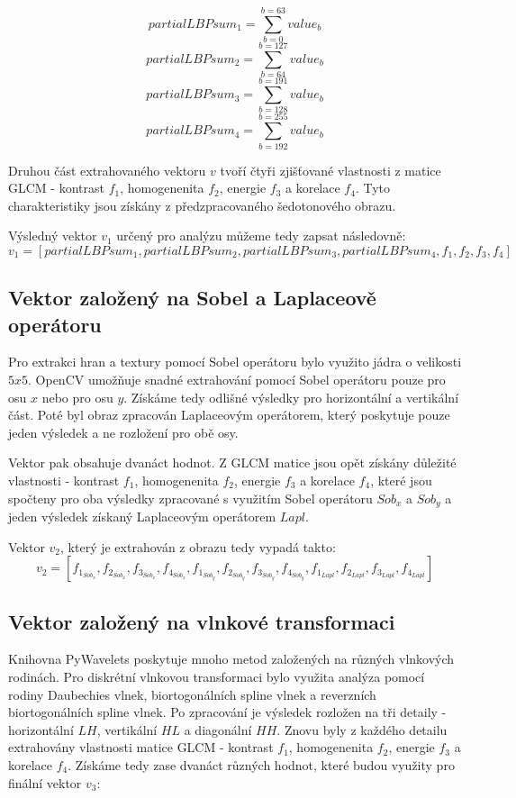 $$partialLBPsum_1 = \sum_{b=0}^{b=63} value_b $$
$$partialLBPsum_2 = \sum_{b=64}^{b=127} value_b $$
$$partialLBPsum_3 = \sum_{b=128}^{b=191} value_b $$
$$partialLBPsum_4 = \sum_{b=192}^{b=255} value_b $$

Druhou část extrahovaného vektoru $v$ tvoří čtyři zjišťované vlastnosti z matice GLCM - kontrast $f_1$, homogenenita $f_2$, energie $f_3$ a korelace $f_4$. Tyto charakteristiky jsou získány z předzpracovaného šedotonového obrazu.

Výsledný vektor $v_1$ určený pro analýzu můžeme tedy zapsat následovně:
$$v_1 = [partialLBPsum_1, partialLBPsum_2, partialLBPsum_3, partialLBPsum_4, f_1, f_2, f_3, f_4]$$

\subsection{Vektor založený na Sobel a Laplaceově operátoru}
Pro extrakci hran a textury pomocí Sobel operátoru bylo využito jádra o velikosti $5x5$. OpenCV umožňuje snadné extrahování pomocí Sobel operátoru pouze pro osu $x$ nebo pro osu $y$. Získáme tedy odlišné výsledky pro horizontální a vertikální část. Poté byl obraz zpracován Laplaceovým operátorem, který poskytuje pouze jeden výsledek a ne rozložení pro obě osy. 

Vektor pak obsahuje dvanáct hodnot. Z GLCM matice jsou opět získány důležité vlastnosti - kontrast $f_1$, homogenenita $f_2$, energie $f_3$ a korelace $f_4$, které jsou spočteny pro oba výsledky zpracované s využitím Sobel operátoru $Sob_x$ a $Sob_y$ a jeden výsledek získaný Laplaceovým operátorem $Lapl$.

Vektor $v_2$, který je extrahován z obrazu tedy vypadá takto:
$$v_2 = [f_{1_{Sob_x}}, f_{2_{Sob_x}}, f_{3_{Sob_x}}, f_{4_{Sob_x}}, f_{1_{Sob_y}}, f_{2_{Sob_y}}, f_{3_{Sob_y}}, f_{4_{Sob_y}}, f_{1_{Lapl}}, f_{2_{Lapl}}, f_{3_{Lapl}}, f_{4_{Lapl}}]$$

\subsection{Vektor založený na vlnkové transformaci}
Knihovna PyWavelets poskytuje mnoho metod založených na různých vlnkových rodinách. Pro diskrétní vlnkovou transformaci bylo využita analýza pomocí rodiny Daubechies vlnek, biortogonálních spline vlnek a reverzních biortogonálních spline vlnek. Po zpracování je výsledek rozložen na tři detaily - horizontální $LH$, vertikální $HL$ a diagonální $HH$. Znovu byly z každého detailu extrahovány vlastnosti matice GLCM - kontrast $f_1$, homogenenita $f_2$, energie $f_3$ a korelace $f_4$. Získáme tedy zase dvanáct různých hodnot, které budou využity pro finální vektor $v_3$:

